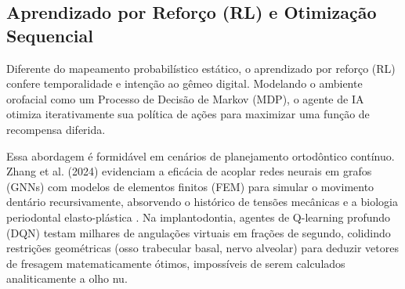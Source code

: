 \subsection{Aprendizado por Reforço (RL) e Otimização Sequencial}
\label{subsec:aprendizado-reforco}

Diferente do mapeamento probabilístico estático, o aprendizado por reforço (RL) confere temporalidade e intenção ao gêmeo digital. Modelando o ambiente orofacial como um Processo de Decisão de Markov (MDP), o agente de IA otimiza iterativamente sua política de ações para maximizar uma função de recompensa diferida.

Essa abordagem é formidável em cenários de planejamento ortodôntico contínuo. Zhang et al. (2024) evidenciam a eficácia de acoplar redes neurais em grafos (GNNs) com modelos de elementos finitos (FEM) para simular o movimento dentário recursivamente, absorvendo o histórico de tensões mecânicas e a biologia periodontal elasto-plástica \cite{zhang2024recursive}. Na implantodontia, agentes de Q-learning profundo (DQN) testam milhares de angulações virtuais em frações de segundo, colidindo restrições geométricas (osso trabecular basal, nervo alveolar) para deduzir vetores de fresagem matematicamente ótimos, impossíveis de serem calculados analiticamente a olho nu.
